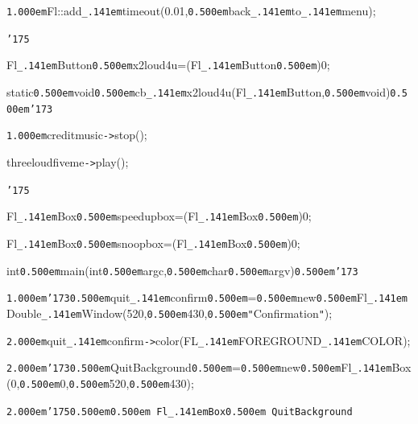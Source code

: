 \documentclass[12pt]{article}
\begin{document}
\noindent
{}{\tt\mc \kern1.000em}Fl::add{\tt\_\kern.141em}timeout(0.01,{\tt\mc \kern0.500em}back{\tt\_\kern.141em}to{\tt\_\kern.141em}menu);

\noindent
{}{\tt\char'175}

\noindent
{}\hfill

\noindent
{}Fl{\tt\_\kern.141em}Button{\tt\mc \kern0.500em}{\tt *}x2loud4u=(Fl{\tt\_\kern.141em}Button{\tt\mc \kern0.500em}{\tt *})0;

\noindent
{}\hfill

\noindent
{}static{\tt\mc \kern0.500em}void{\tt\mc \kern0.500em}cb{\tt\_\kern.141em}x2loud4u(Fl{\tt\_\kern.141em}Button{\tt *},{\tt\mc \kern0.500em}void{\tt *}){\tt\mc \kern0.500em}{\tt\char'173}

\noindent
{}{\tt\mc \kern1.000em}creditmusic{\tt -}{\tt >}stop();

\noindent
{}threeloudfiveme{\tt -}{\tt >}play();

\noindent
{}{\tt\char'175}

\noindent
{}\hfill

\noindent
{}Fl{\tt\_\kern.141em}Box{\tt\mc \kern0.500em}{\tt *}speedupbox=(Fl{\tt\_\kern.141em}Box{\tt\mc \kern0.500em}{\tt *})0;

\noindent
{}\hfill

\noindent
{}Fl{\tt\_\kern.141em}Box{\tt\mc \kern0.500em}{\tt *}snoopbox=(Fl{\tt\_\kern.141em}Box{\tt\mc \kern0.500em}{\tt *})0;

\noindent
{}\hfill

\noindent
{}int{\tt\mc \kern0.500em}main(int{\tt\mc \kern0.500em}argc,{\tt\mc \kern0.500em}char{\tt\mc \kern0.500em}{\tt *}{\tt *}argv){\tt\mc \kern0.500em}{\tt\char'173}

\noindent
{}{\tt\mc \kern1.000em}{\tt\char'173}{\tt\mc \kern0.500em}quit{\tt\_\kern.141em}confirm{\tt\mc \kern0.500em}={\tt\mc \kern0.500em}new{\tt\mc \kern0.500em}Fl{\tt\_\kern.141em}Double{\tt\_\kern.141em}Window(520,{\tt\mc \kern0.500em}430,{\tt\mc \kern0.500em}{\tt "}Confirmation{\tt "});

\noindent
{}{\tt\mc \kern2.000em}quit{\tt\_\kern.141em}confirm{\tt -}{\tt >}color(FL{\tt\_\kern.141em}FOREGROUND{\tt\_\kern.141em}COLOR);

\noindent
{}{\tt\mc \kern2.000em}{\tt\char'173}{\tt\mc \kern0.500em}QuitBackground{\tt\mc \kern0.500em}={\tt\mc \kern0.500em}new{\tt\mc \kern0.500em}Fl{\tt\_\kern.141em}Box(0,{\tt\mc \kern0.500em}0,{\tt\mc \kern0.500em}520,{\tt\mc \kern0.500em}430);

\noindent
{}{\tt\mc \kern2.000em}{\tt\char'175}{\tt\mc \kern0.500em}\tt\mc {\tt /}{\tt /}\kern0.500em Fl{\tt\_\kern.141em}Box{\tt *}\kern0.500em QuitBackground
\end{document}
